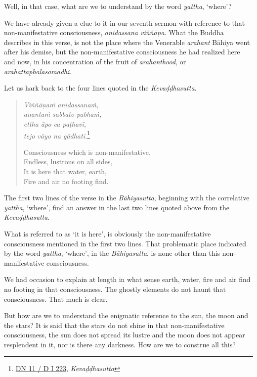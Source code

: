 Well, in that case, what are we to understand by the word \emph{yattha}, `where'?

We have already given a clue to it in our seventh sermon with reference to that non-manifestative consciousness, \emph{anidassana viññāṇa}. What the Buddha describes in this verse, is not the place where the Venerable \emph{arahant} Bāhiya went after his demise, but the non-manifestative consciousness he had realized here and now, in his concentration of the fruit of \emph{arahanthood}, or \emph{arahattaphalasamādhi}.

Let us hark back to the four lines quoted in the \emph{Kevaḍḍhasutta}.

\clearpage

\begin{quote}
\emph{Viññāṇaṁ anidassanaṁ,}\\
\emph{anantaṁ sabbato pabhaṁ,}\\
\emph{ettha āpo ca paṭhavī,}\\
\emph{tejo vāyo na gādhati.}\footnote{\href{https://suttacentral.net/dn11/pli/ms}{DN 11 / D I 223}, \emph{Kevaḍḍhasutta}}

Consciousness which is non-manifestative,\\
Endless, lustrous on all sides,\\
It is here that water, earth,\\
Fire and air no footing find.
\end{quote}

The first two lines of the verse in the \emph{Bāhiyasutta}, beginning with the correlative \emph{yattha}, `where', find an answer in the last two lines quoted above from the \emph{Kevaḍḍhasutta}.

What is referred to as `it is here', is obviously the non-manifestative consciousness mentioned in the first two lines. That problematic place indicated by the word \emph{yattha}, `where', in the \emph{Bāhiyasutta}, is none other than this non-manifestative consciousness.

We had occasion to explain at length in what sense earth, water, fire and air find no footing in that consciousness. The ghostly elements do not haunt that consciousness. That much is clear.

But how are we to understand the enigmatic reference to the sun, the moon and the stars? It is said that the stars do not shine in that non-manifestative consciousness, the sun does not spread its lustre and the moon does not appear resplendent in it, nor is there any darkness. How are we to construe all this?

